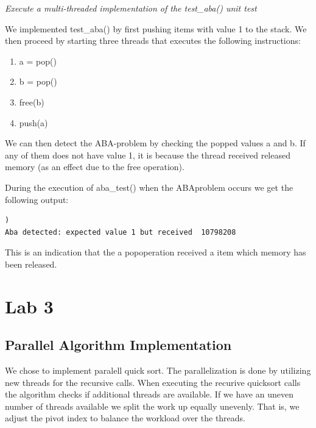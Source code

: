 \documentclass[a4paper,12pt]{article}
\begin{document}
\begin{itemize}
\begin{minipage}{\textwidth}
\item \textit{Execute a multi-threaded implementation of the test\_aba() unit test}

We implemented test\_aba() by first pushing items with value 1 to the stack. We then proceed by starting three threads that executes the following instructions:

\begin{enumerate}
	\item a = pop()
	\item b = pop()
	\item free(b)
	\item push(a)
\end{enumerate}

We can then detect the ABA-problem by checking the popped values a and b. If any of them does not have value 1, it is because the thread received released memory (as an effect due to the free operation).

During the execution of aba\_test() when the ABA\-problem occurs we get the following output:

\begin{lstlisting})
Aba detected: expected value 1 but received  10798208
\end{lstlisting}

This is an indication that the a pop\-operation received a item which memory has been released.

\end{minipage}
\end{itemize}

\section{Lab 3}

\subsection{Parallel Algorithm Implementation}

	We chose to implement paralell quick sort. The parallelization is done by utilizing new threads for the recursive calls. When executing the recurive quicksort calls the algorithm checks if additional threads are available. If we have an uneven number of threads available we split the work up equally unevenly. That is, we adjust the pivot index to balance the workload over the threads. 
\end{document}
